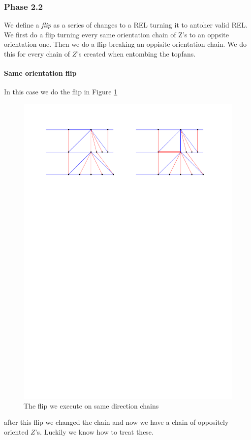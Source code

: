 \subsubsection{Phase 2.2}


We define a \emph{flip} as a series of changes to a REL turning it to antoher valid REL.
We first do a flip turning every same orientation chain of Z's to an oppsite orientation one. Then we do a flip breaking an oppisite orientation chain. We do this for every chain of $Z$'s created when entombing the topfans.  


\paragraph{Same orientation flip}

In this case we do the flip in Figure \ref{fig:uni:sameFlip}

\begin{figure}[h]
  \centering
  \includegraphics[width =\textwidth]{unifiedAlgo/img/post/sameFlip}
  \caption{The flip we execute on same direction chains}
  \label{fig:uni:sameFlip}
\end{figure}
 after this flip we changed the chain and now we have a chain of oppositely oriented $Z$'s. Luckily we know how to treat these.

